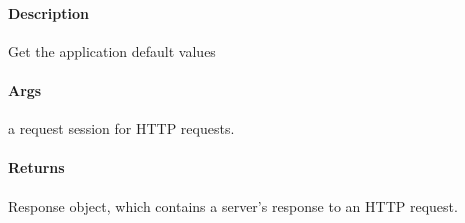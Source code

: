 \documentclass[letterpaper,10pt,english]{sphinxmanual}
\begin{document}
\begin{fulllineitems}
\label{\detokenize{gemini_lidar_hub_API:gemini_lidar_hub_API.get_lidar_hub_default_settings}}
\pysigstartsignatures
{}
\pysigstopsignatures

\paragraph{Description}
\label{\detokenize{gemini_lidar_hub_API:id5}}
\sphinxAtStartPar
Get the application default values


\paragraph{Args}
\label{\detokenize{gemini_lidar_hub_API:id6}}\begin{description}
\sphinxAtStartPar
a request session for HTTP requests.

\end{description}


\paragraph{Returns}
\label{\detokenize{gemini_lidar_hub_API:id7}}\begin{description}
\sphinxAtStartPar
Response object, which contains a server’s response to an HTTP request.

\end{description}

\end{fulllineitems}

\end{document}
